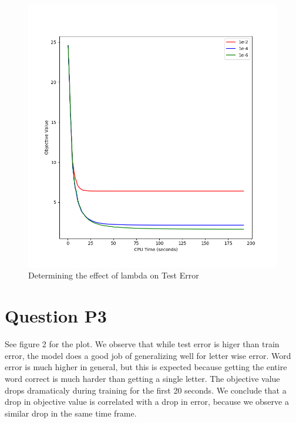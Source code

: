 \documentclass[11pt]{report}
\begin{document}
\begin{figure}[b]
\centering
\includegraphics[scale=0.4]{p2_figure.png}
\caption{Determining the effect of lambda on Test Error}
\end{figure}
\section*{Question P3}
See figure 2 for the plot. We observe that while test error is
higer than train error, the model does a good job of generalizing
well for letter wise error. Word error is much higher in general,
but this is expected because getting the entire word correct is
much harder than getting a single letter. The objective value 
drops dramaticaly during training for the first 20 seconds. We
conclude that a drop in objective value is correlated with a drop
in error, because we observe a similar drop in the same time frame.
\end{document}
